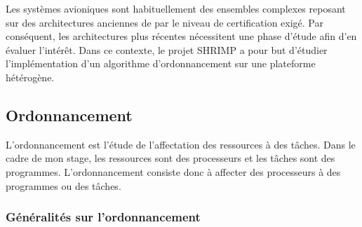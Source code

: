 

Les systèmes avioniques sont habituellement des ensembles complexes reposant sur des architectures anciennes de par le niveau de certification exigé. Par conséquent, les architectures plus récentes nécessitent une phase d'étude afin d'en évaluer l'intérêt. Dans ce contexte, le projet SHRIMP a pour but d'étudier l'implémentation d'un algorithme d'ordonnancement sur une plateforme hétérogène.   

\subsection{Ordonnancement}

L'ordonnancement est l'étude de l'affectation des ressources à des tâches. Dans le cadre de mon stage, les ressources sont des processeurs et les tâches sont des programmes. L'ordonnancement consiste donc à affecter des processeurs à des programmes ou des tâches.

\subsubsection{Généralités sur l'ordonnancement}


